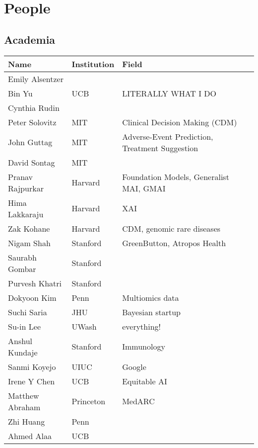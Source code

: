 \section{People}
\subsection{Academia}
\begin{longtable}{|l|l|l|}
\hline
\textbf{Name} & \textbf{Institution} & \textbf{Field} \\
\hline
Emily Alsentzer & & \\
Bin Yu & UCB & LITERALLY WHAT I DO \\
Cynthia Rudin & & \\
Peter Solovitz & MIT & Clinical Decision Making (CDM) \\
John Guttag & MIT & Adverse-Event Prediction, Treatment Suggestion \\
David Sontag & MIT & \\
Pranav Rajpurkar & Harvard & Foundation Models, Generalist MAI, GMAI \\
Hima Lakkaraju & Harvard & XAI \\
Zak Kohane & Harvard & CDM, genomic rare diseases \\
Nigam Shah & Stanford & GreenButton, Atropos Health \\
Saurabh Gombar & Stanford & \\
Purvesh Khatri & Stanford & \\
Dokyoon Kim & Penn & Multiomics data \\
Suchi Saria & JHU & Bayesian startup \\
Su-in Lee & UWash & everything! \\
Anshul Kundaje & Stanford & Immunology \\
Sanmi Koyejo & UIUC & Google \\
Irene Y Chen & UCB & Equitable AI \\
Matthew Abraham & Princeton & MedARC \\
Zhi Huang & Penn & \\
Ahmed Alaa & UCB & \\
\hline
\end{longtable}

